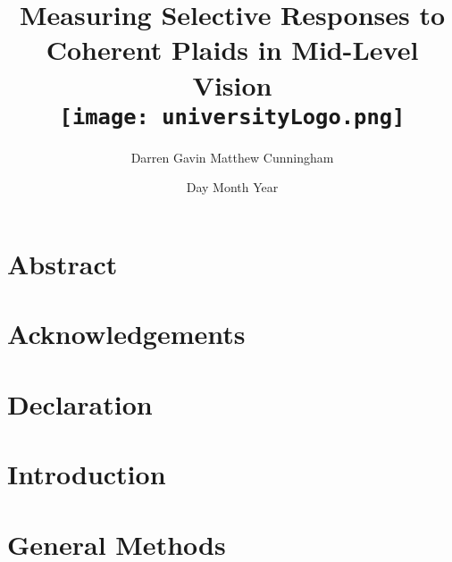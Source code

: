 \documentclass[11pt, a4paper]{report}
\title{
	{Measuring Selective Responses to Coherent Plaids in Mid-Level Vision}\\
	\bigskip
	{\texttt{[image: universityLogo.png]}}
}
\author{Darren Gavin Matthew Cunningham}
\date{Day Month Year}
\numberwithin{equation}{section}
\begin{document}
\maketitle


\chapter*{Abstract}


\chapter*{}


\chapter*{Acknowledgements}


\chapter*{Declaration}


\chapter*{}


\tableofcontents

\listoffigures

\listoftables




\chapter{Introduction}



\chapter{General Methods}



%


\end{document}
